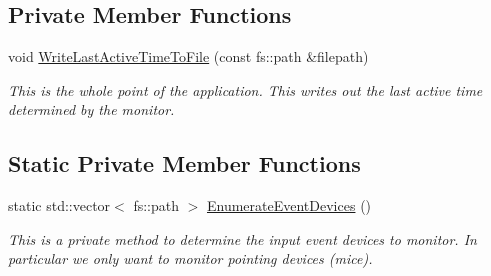 \subsection*{Private Member Functions}
\begin{DoxyCompactItemize}
\item 
void \mbox{\hyperlink{classEventDetect_1_1Monitor_af1175eb0bedd877b861bfd76451e8711}{Write\+Last\+Active\+Time\+To\+File}} (const fs\+::path \&filepath)
\begin{DoxyCompactList}\small\item\em This is the whole point of the application. This writes out the last active time determined by the monitor. \end{DoxyCompactList}\end{DoxyCompactItemize}
\subsection*{Static Private Member Functions}
\begin{DoxyCompactItemize}
\item 
static std\+::vector$<$ fs\+::path $>$ \mbox{\hyperlink{classEventDetect_1_1Monitor_a46b24be7323eaa4f6e396d14108aea6e}{Enumerate\+Event\+Devices}} ()
\begin{DoxyCompactList}\small\item\em This is a private method to determine the input event devices to monitor. In particular we only want to monitor pointing devices (mice). \end{DoxyCompactList}\end{DoxyCompactItemize}
